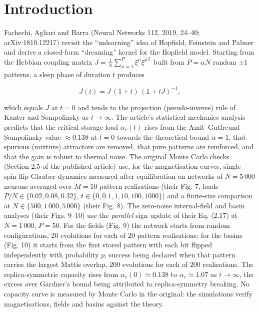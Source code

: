 \section{Introduction}\label{introduction}

Fachechi, Agliari and Barra \supercite{fachechi2019dreaming} (Neural
Networks 112, 2019, 24--40; arXiv:1810.12217) revisit the ``unlearning''
idea of Hopfield, Feinstein and Palmer \supercite{hopfield1983unlearning}
and derive a closed-form ``dreaming'' kernel for the Hopfield model.
Starting from the Hebbian coupling matrix
\(J = \frac{1}{N}\sum_{\mu=1}^{P}\xi^\mu\xi^{\mu\mathsf T}\) built from
\(P = \alpha N\) random \(\pm1\) patterns, a sleep phase of duration
\(t\) produces

\[J(t) = J\,(1+t)\,(\mathbb 1 + tJ)^{-1},\]

which equals \(J\) at \(t = 0\) and tends to the projection
(pseudo-inverse) rule of Kanter and Sompolinsky
\supercite{kanter1987projector} as \(t \to \infty\). The article's
statistical-mechanics analysis predicts that the critical storage load
\(\alpha_c(t)\) rises from the Amit--Gutfreund--Sompolinsky value
\supercite{amit1985storing} \(\approx 0.138\) at \(t = 0\) towards the
theoretical bound \(\alpha = 1\), that spurious (mixture) attractors are
removed, that pure patterns are reinforced, and that the gain is robust
to thermal noise. The original Monte Carlo checks (Section 2.5 of the
published article) use, for the magnetisation curves, single-spin-flip
Glauber dynamics measured after equilibration on networks of
\(N = 5\,000\) neurons averaged over \(M = 10\) pattern realisations
(their Fig. 7, loads \(P/N \in \{0.02, 0.08, 0.32\}\),
\(t \in \{0, 0.1, 1, 10,
100, 1000\}\)) and a finite-size comparison at \(N \in \{500, 1\,000,
5\,000\}\) (their Fig. 8). The zero-noise internal-field and basin
analyses (their Figs. 9--10) use the \emph{parallel} sign update of
their Eq. (2.17) at \(N = 1\,000\), \(P = 50\). For the fields (Fig. 9)
the network starts from random configurations, 20 evolutions for each of
20 pattern realisations; for the basins (Fig. 10) it starts from the
first stored pattern with each bit flipped independently with
probability \(p\), success being declared when that pattern carries the
largest Mattis overlap, 200 evolutions for each of 200 realisations. The
replica-symmetric capacity rises from \(\alpha_c(0) \simeq 0.138\) to
\(\alpha_c \simeq 1.07\) as \(t \to \infty\), the excess over Gardner's
bound being attributed to replica-symmetry breaking. No capacity curve
is measured by Monte Carlo in the original: the simulations verify
magnetisations, fields and basins against the theory.

